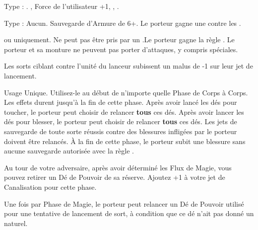 Type : \longbow{}. , Force de l'utilisateur +1, , . %

\endpricelist

\armymagicalarmour

\startpricelist

Type : Aucun. Sauvegarde d'Armure de 6+. Le porteur gagne une  contre les \magicalattacks{}.

\endpricelist

\armytalismans

\startpricelist

\archmage{} ou \mage{} uniquement. Ne peut pas être pris par un \riddenmonster{}.\newline Le porteur gagne la règle \ethereal{}. Le porteur et sa monture ne peuvent pas porter d'attaques, y compris spéciales.

\endpricelist

\armyenchanteditems

\startpricelist

Les sorts ciblant contre l'unité du lanceur subissent un malus de -1 sur leur jet de lancement.

Usage Unique. Utilisez-le au début de n'importe quelle Phase de Corps à Corps. Les effets durent jusqu'à la fin de cette phase. Après avoir lancé les dés pour toucher, le porteur peut choisir de relancer \textbf{tous} ces dés. Après avoir lancer les dés pour blesser, le porteur peut choisir de relancer \textbf{tous} ces dés. Les jets de sauvegarde de toute sorte réussis contre des blessures infligées par le porteur doivent être relancés. À la fin de cette phase, le porteur subit une blessure sans aucune sauvegarde autorisée avec la règle .

\endpricelist

\armyarcaneitems

\startpricelist

Au tour de votre adversaire, après avoir déterminé les Flux de Magie, vous pouvez retirer un Dé de Pouvoir de sa réserve. Ajoutez +1 à votre jet de Canalisation pour cette phase.

Une fois par Phase de Magie, le porteur peut relancer un Dé de Pouvoir utilisé pour une tentative de lancement de sort, à condition que ce dé n'ait pas donné un  naturel.

